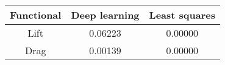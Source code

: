 \begin{tabular}{|c|c|c|}
\hline
Functional&Deep learning&Least squares\\ 
\hline

Lift & 0.06223 & 0.00000\\ 
\hline
Drag & 0.00139 & 0.00000\\ 
\hline
\end{tabular}

